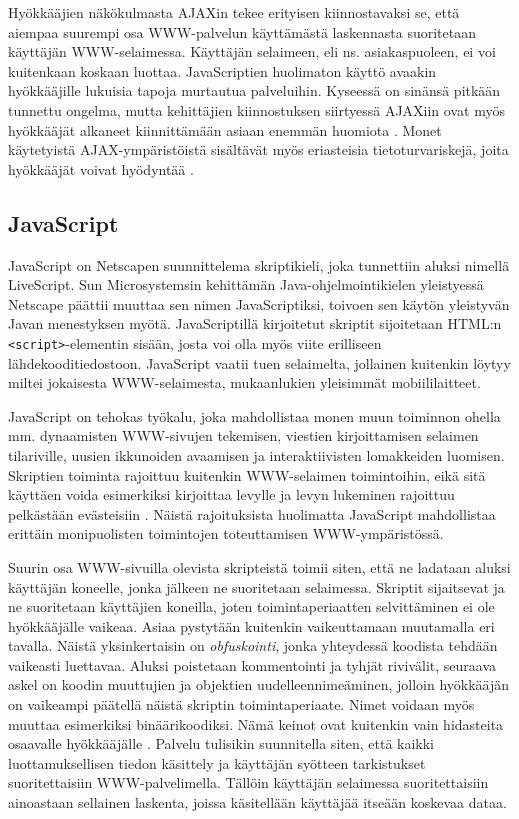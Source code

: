 Hyökkääjien näkökulmasta AJAXin tekee erityisen kiinnostavaksi se,
että aiempaa suurempi osa WWW-palvelun käyttämästä laskennasta
suoritetaan käyttäjän WWW-selaimessa. Käyttäjän selaimeen, eli
ns. asiakaspuoleen, ei voi kuitenkaan koskaan luottaa.
JavaScriptien huolimaton käyttö avaakin hyökkääjille lukuisia tapoja
murtautua palveluihin. Kyseessä on sinänsä pitkään tunnettu ongelma,
mutta kehittäjien kiinnostuksen siirtyessä AJAXiin ovat myös
hyökkääjät alkaneet kiinnittämään asiaan enemmän huomiota \cite{AJAX}.
Monet käytetyistä AJAX-ympäristöistä sisältävät myös eriasteisia
tietoturvariskejä, joita hyökkääjät voivat hyödyntää \cite{JSH}.

\subsection{JavaScript}

JavaScript on Netscapen suunnittelema skriptikieli, joka tunnettiin
aluksi nimellä LiveScript. Sun Microsystemsin kehittämän
Java-ohjelmointikielen yleistyessä Netscape päättii muuttaa sen nimen
JavaScriptiksi, toivoen sen käytön yleistyvän Javan menestyksen
myötä. JavaScriptillä kirjoitetut skriptit sijoitetaan HTML:n
\texttt{<script>}-elementin sisään, josta voi olla myös viite
erilliseen lähdekooditiedostoon. JavaScript vaatii tuen selaimelta,
jollainen kuitenkin löytyy miltei jokaisesta WWW-selaimesta, mukaanlukien
yleisimmät mobiililaitteet.

JavaScript on tehokas työkalu, joka mahdollistaa monen muun toiminnon
ohella mm. dynaamisten WWW-sivujen tekemisen, viestien kirjoittamisen
selaimen tilariville, uusien ikkunoiden avaamisen ja interaktiivisten
lomakkeiden luomisen. Skriptien toiminta rajoittuu kuitenkin
WWW-selaimen toimintoihin, eikä sitä käyttäen voida esimerkiksi
kirjoittaa levylle ja levyn lukeminen rajoittuu pelkästään evästeisiin
\cite{JavaScript}. Näistä rajoituksista huolimatta JavaScript
mahdollistaa erittäin monipuolisten toimintojen toteuttamisen
WWW-ympäristössä.

Suurin osa WWW-sivuilla olevista skripteistä toimii siten, että ne
ladataan aluksi käyttäjän koneelle, jonka jälkeen ne suoritetaan
selaimessa. Skriptit sijaitsevat ja ne suoritetaan käyttäjien
koneilla, joten toimintaperiaatten selvittäminen ei ole hyökkääjälle
vaikeaa. Asiaa pystytään kuitenkin vaikeuttamaan muutamalla eri
tavalla. Näistä yksinkertaisin on \emph{obfuskointi}, jonka yhteydessä
koodista tehdään vaikeasti luettavaa. Aluksi poistetaan kommentointi
ja tyhjät rivivälit, seuraava askel on koodin muuttujien ja objektien
uudelleennimeäminen, jolloin hyökkääjän on vaikeampi päätellä näistä
skriptin toimintaperiaate. Nimet voidaan myös muuttaa esimerkiksi
binäärikoodiksi. Nämä keinot ovat kuitenkin vain hidasteita osaavalle
hyökkääjälle \cite{AJAX}. Palvelu tulisikin suunnitella siten, että
kaikki luottamuksellisen tiedon käsittely ja käyttäjän syötteen
tarkistukset suoritettaisiin WWW-palvelimella. Tällöin käyttäjän
selaimessa suoritettaisiin ainoastaan sellainen laskenta, joissa
käsitellään käyttäjää itseään koskevaa dataa.

